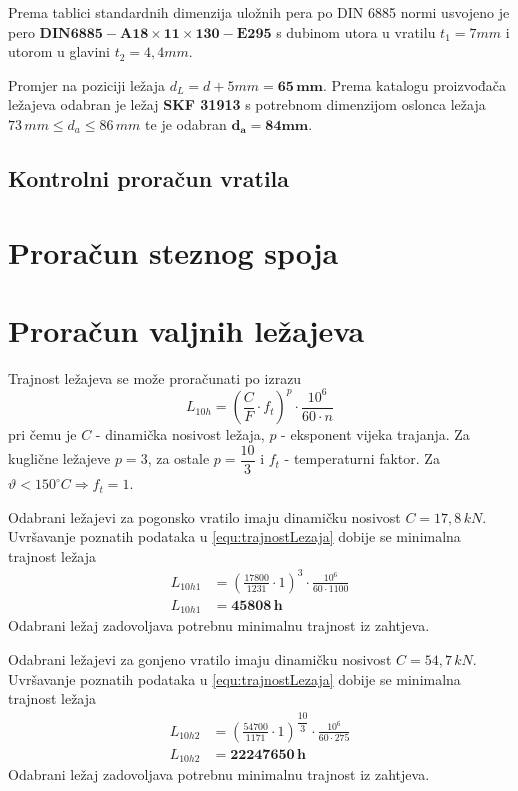 \documentclass[11pt,a4paper]{report}
\begin{document}
Prema tablici standardnih dimenzija uložnih pera\cite{potrebniMaterijali} po DIN 6885 normi usvojeno je pero $\mathbf{DIN6885-A 18 \times 11 \times 130-E295}$ s dubinom utora u vratilu $t_1=7mm$ i utorom u glavini $t_2=4,4mm$.

Promjer na poziciji ležaja $d_L=d+5mm= \mathbf{65 \,mm}$.
Prema katalogu proizvođača ležajeva\cite{skf} odabran je ležaj \textbf{SKF 31913} s potrebnom dimenzijom oslonca ležaja $73 \, mm \leq d_a \leq 86 \, mm$ te je odabran $\mathbf{d_a=84mm}$.

\subsection{Kontrolni proračun vratila}

\section{Proračun steznog spoja}

\section{Proračun valjnih ležajeva}
Trajnost ležajeva se može proračunati po izrazu
\begin{equation}
L_{10h}=\left(\frac{C}{F} \cdot f_t \right)^p \cdot \frac{10^6}{60 \cdot n}
\label{equ:trajnostLezaja}
\end{equation}
pri čemu je $C$ - dinamička nosivost ležaja, $p$ - eksponent vijeka trajanja. Za kuglične ležajeve $p=3$, za ostale $p=\dfrac{10}{3}$ i $f_t$ - temperaturni faktor. Za $\vartheta < 150^\circ C \Rightarrow f_t=1$.

Odabrani ležajevi za pogonsko vratilo imaju dinamičku nosivost $C=17,8 \,kN$.
Uvršavanje poznatih podataka u \eqref{equ:trajnostLezaja} dobije se minimalna trajnost ležaja
\begin{align*}
L_{10h1}&=\left(\frac{17800}{1231} \cdot 1 \right)^3 \cdot \frac{10^6}{60 \cdot 1100}\\
L_{10h1}&=\mathbf{45808\, h}
\end{align*}
Odabrani ležaj zadovoljava potrebnu minimalnu trajnost iz zahtjeva.

Odabrani ležajevi za gonjeno vratilo imaju dinamičku nosivost $C=54,7 \,kN$.
Uvršavanje poznatih podataka u \eqref{equ:trajnostLezaja} dobije se minimalna trajnost ležaja
\begin{align*}
L_{10h2}&=\left(\frac{54700}{1171} \cdot 1 \right)^{\dfrac{10}{3}} \cdot \frac{10^6}{60 \cdot 275}\\
L_{10h2}&=\mathbf{22247650\, h}
\end{align*}
Odabrani ležaj zadovoljava potrebnu minimalnu trajnost iz zahtjeva.


\newpage
\nocite{*}


\newpage
\appendix
{}


\end{document}
